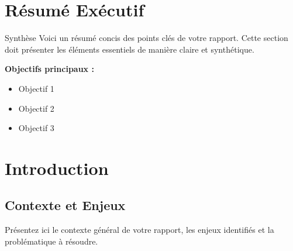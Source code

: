 \documentclass{modern-report}
\begin{document}
\makemoderncover

\tableofcontents
\clearpage

\chapter*{Résumé Exécutif}

\begin{modernbox}{Synthèse}
Voici un résumé concis des points clés de votre rapport. Cette section doit présenter les éléments essentiels de manière claire et synthétique.

\modernseparator

\textbf{Objectifs principaux :}
\begin{itemize}
    \item Objectif 1
    \item Objectif 2 
    \item Objectif 3
\end{itemize}
\end{modernbox}


\chapter{Introduction}

\section{Contexte et Enjeux}

Présentez ici le contexte général de votre rapport, les enjeux identifiés et la problématique à résoudre.
\end{document}
